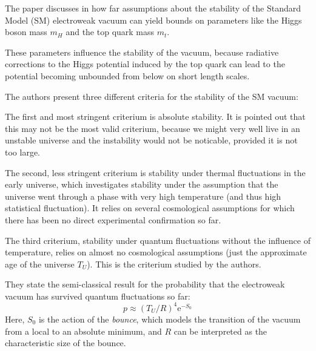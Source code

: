 

\noindent
The paper\cite{isidori} discusses in how far assumptions about the stability of the Standard Model (SM) electroweak vacuum can yield bounds on parameters like the Higgs boson mass $m_H$ and the top quark mass $m_t$.

These parameters influence the stability of the vacuum, because radiative corrections to the Higgs potential induced by the top quark can lead to the potential becoming unbounded from below on short length scales.

The authors present three different criteria for the stability of the SM vacuum:

The first and most stringent criterium is absolute stability.
It is pointed out that this may not be the most valid criterium, because we might very well live in an unstable universe and the instability would not be noticable, provided it is not too large.

The second, less stringent criterium is stability under thermal fluctuations in the early universe, which investigates stability under the assumption that the universe went through a phase with very high temperature (and thus high statistical fluctuation).
It relies on several cosmological assumptions for which there has been no direct experimental confirmation so far.

The third criterium, stability under quantum fluctuations without the influence of temperature, relies on almost no cosmological assumptions (just the approximate age of the universe $T_U$).
This is the criterium studied by the authors.

They state the semi-classical result for the probability that the electroweak vacuum has survived quantum fluctuations so far:
\begin{equation}
  p \approx (T_U/R)^4 \mathrm{e}^{-S_0}
\end{equation}
Here, $S_0$ is the action of the \emph{bounce}, which models the transition of the vacuum from a local to an absolute minimum, and $R$ can be interpreted as the characteristic size of the bounce.

